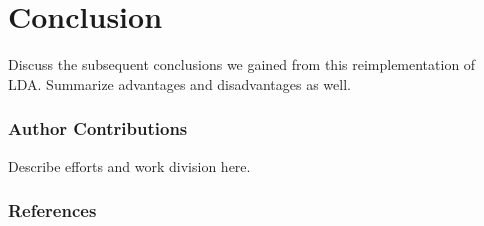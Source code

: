 \documentclass{article} %
\begin{document}
\section{Conclusion}
Discuss the subsequent conclusions we gained from this reimplementation of LDA.
Summarize advantages and disadvantages as well.

\subsubsection*{Author Contributions}
Describe efforts and work division here.
%

\subsubsection*{References}

\end{document}
